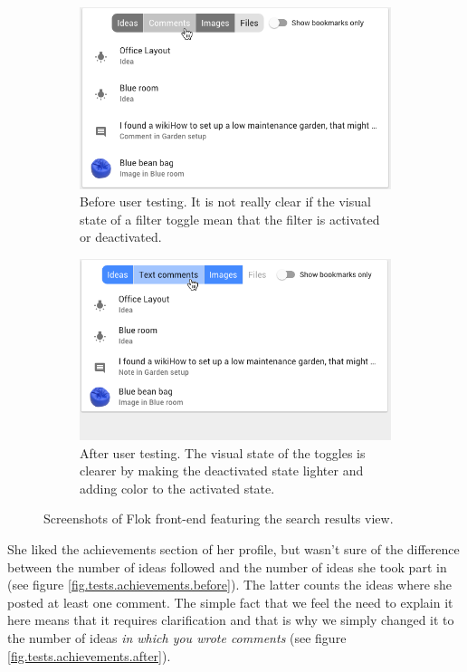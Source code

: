 \documentclass[a4paper,12pt, oneside]{article}
\begin{document}
\begin{figure}[!htb]
    \begin{subfigure}[t]{.495\textwidth}
        \includegraphics[width=\textwidth]{images/user_tests/search_before.png}
        \caption{Before user testing. It is not really clear if the visual state of a filter toggle mean that the filter is activated or deactivated.}
        \label{fig.tests.search.before}
    \end{subfigure}
    \hfill
    \begin{subfigure}[t]{.495\textwidth}
        \includegraphics[width=\textwidth]{images/user_tests/search_after.png}
        \caption{After user testing. The visual state of the toggles is clearer by making the deactivated state lighter and adding color to the activated state.}
        \label{fig.tests.search.after}
    \end{subfigure}
    \caption{Screenshots of Flok front-end featuring the search results view.}
    \label{fig.tests.search}
\end{figure}

She liked the achievements section of her profile, but wasn't sure of the difference between the number of ideas followed and the number of ideas she took part in (see figure \ref{fig.tests.achievements.before}).
The latter counts the ideas where she posted at least one comment.
The simple fact that we feel the need to explain it here means that it requires clarification and that is why we simply changed it to the number of ideas \emph{in which you wrote comments} (see figure \ref{fig.tests.achievements.after}).
\end{document}
